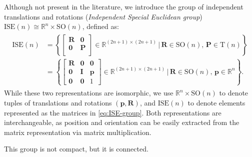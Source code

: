 \begin{example}\label{ex:independent-translation-rotation-ISE}
    Although not present in the literature, we introduce the group of independent translations and rotations (\emph{Independent Special Euclidean group}) $\text{ISE}(n)\cong\mathbb{R}^n\times\text{SO}(n)$, defined as:
    \begin{align}
        \begin{split}
            \text{ISE}(n) &= \left\{\begin{bmatrix}
            \mathbf{R} & \mathbf{0}\\
            \mathbf{0} & \mathbf{P}\\
            \end{bmatrix}\in\mathbb{R}^{(2n+1)\times(2n+1)}\,\biggl|\, \mathbf{R}\in\text{SO}(n),\,\mathbf{P}\in\text{T}(n)\right\}\\
            &= \left\{\begin{bmatrix}
            \mathbf{R} & \mathbf{0} & \mathbf{0}\\
            \mathbf{0} & \mathbf{I} & \mathbf{p}\\
            \mathbf{0} & \mathbf{0} & 1
            \end{bmatrix}\in\mathbb{R}^{(2n+1)\times(2n+1)}\,\Biggl|\, \mathbf{R}\in\text{SO}(n),\,\mathbf{p}\in\mathbb{R}^n\right\}.
        \end{split} \label{eq:ISE-group}
    \end{align}
    While these two representations are isomorphic, we use $\mathbb{R}^n\times \text{SO}(n)$ to denote tuples of translations and rotations $(\mathbf{p},\mathbf{R})$, and $\text{ISE}(n)$ to denote elements represented as the matrices in \eqref{eq:ISE-group}. Both representations are interchangeable, as position and orientation can be easily extracted from the matrix representation via matrix multiplication.

    This group is not compact, but it is connected.
\end{example}
